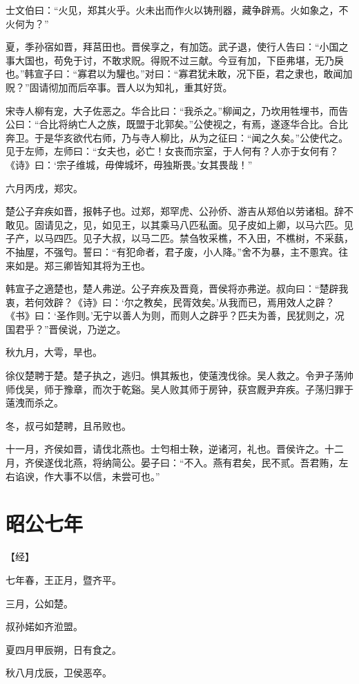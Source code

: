 \documentclass[a4paper,12pt,UTF8,twoside]{ctexbook}
\begin{document}
士文伯曰：“火见，郑其火乎。火未出而作火以铸刑器，藏争辟焉。火如象之，不火何为？”

夏，季孙宿如晋，拜莒田也。晋侯享之，有加笾。武子退，使行人告曰：“小国之事大国也，苟免于讨，不敢求贶。得贶不过三献。今豆有加，下臣弗堪，无乃戾也。”韩宣子曰：“寡君以为驩也。”对曰：“寡君犹未敢，况下臣，君之隶也，敢闻加贶？”固请彻加而后卒事。晋人以为知礼，重其好货。

宋寺人柳有宠，大子佐恶之。华合比曰：“我杀之。”柳闻之，乃坎用牲埋书，而告公曰：“合比将纳亡人之族，既盟于北郭矣。”公使视之，有焉，遂逐华合比。合比奔卫。于是华亥欲代右师，乃与寺人柳比，从为之征曰：“闻之久矣。”公使代之。见于左师，左师曰：“女夫也，必亡！女丧而宗室，于人何有？人亦于女何有？《诗》曰：‘宗子维城，毋俾城坏，毋独斯畏。’女其畏哉！”

六月丙戌，郑灾。

楚公子弃疾如晋，报韩子也。过郑，郑罕虎、公孙侨、游吉从郑伯以劳诸柤。辞不敢见。固请见之，见，如见王，以其乘马八匹私面。见子皮如上卿，以马六匹。见子产，以马四匹。见子大叔，以马二匹。禁刍牧采樵，不入田，不樵树，不采蓺，不抽屋，不强匄。誓曰：“有犯命者，君子废，小人降。”舍不为暴，主不慁宾。往来如是。郑三卿皆知其将为王也。

韩宣子之適楚也，楚人弗逆。公子弃疾及晋竟，晋侯将亦弗逆。叔向曰：“楚辟我衷，若何效辟？《诗》曰：‘尔之教矣，民胥效矣。’从我而已，焉用效人之辟？《书》曰：‘圣作则。’无宁以善人为则，而则人之辟乎？匹夫为善，民犹则之，况国君乎？”晋侯说，乃逆之。

秋九月，大雩，旱也。

徐仪楚聘于楚。楚子执之，逃归。惧其叛也，使薳洩伐徐。吴人救之。令尹子荡帅师伐吴，师于豫章，而次于乾谿。吴人败其师于房钟，获宫厩尹弃疾。子荡归罪于薳洩而杀之。

冬，叔弓如楚聘，且吊败也。

十一月，齐侯如晋，请伐北燕也。士匄相士鞅，逆诸河，礼也。晋侯许之。十二月，齐侯遂伐北燕，将纳简公。晏子曰：“不入。燕有君矣，民不贰。吾君贿，左右谄谀，作大事不以信，未尝可也。”


\chapter{昭公七年}


【经】

七年春，王正月，暨齐平。

三月，公如楚。

叔孙婼如齐涖盟。

夏四月甲辰朔，日有食之。

秋八月戊辰，卫侯恶卒。
\end{document}
